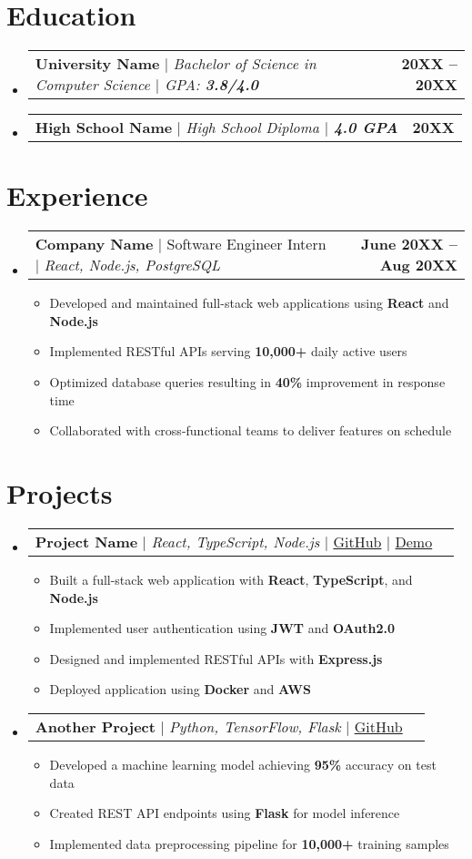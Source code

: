 \documentclass[letterpaper,11pt]{article}
\makeatletter
\newcommand{\resumeItem}[1]{
    \item\small{
        {#1 \vspace{-2pt}}
    }
    }
\newcommand{\resumeProjectHeading}[2]{
        \item
        \begin{tabular*}{1.001\textwidth}{l@{\extracolsep{\fill}}r}
        \small#1 & \textbf{\small #2}\\
        \end{tabular*}\vspace{-7pt}
    }
\newcommand{\resumeSubHeadingListStart}{\begin{itemize}[leftmargin=0.0in, label={}]}
\newcommand{\resumeSubHeadingListEnd}{\end{itemize}}
\newcommand{\resumeItemListStart}{\begin{itemize}}
\newcommand{\resumeItemListEnd}{\end{itemize}\vspace{-5pt}}
\newcommand{\resumeEducationHeading}[2]{
        \item
        \begin{tabular*}{1.001\textwidth}{l@{\extracolsep{\fill}}r}
        \small#1 & \textbf{\small #2}\\
        \end{tabular*}\vspace{-20pt}
    }
\makeatother
\begin{document}
    \section{Education}
        \resumeSubHeadingListStart
            \resumeEducationHeading
                {\textbf{University Name} $|$ \emph{Bachelor of Science in Computer Science  $|$ \textit{GPA: \textbf{3.8/4.0}}}}{20XX -- 20XX}
            \resumeEducationHeading
                {\textbf{High School Name} $|$ \emph{High School Diploma $|$ \textit{\textbf{4.0 GPA}}}}{20XX}
        \resumeSubHeadingListEnd
    \vspace{2pt}

    \section{Experience}
        \resumeSubHeadingListStart
        \resumeProjectHeading
            {\textbf{Company Name} $|$ Software Engineer Intern $|$ \emph{React, Node.js, PostgreSQL}}{June 20XX -- Aug 20XX}
            \resumeItemListStart
                \resumeItem{Developed and maintained full-stack web applications using \textbf{React} and \textbf{Node.js}}
                \resumeItem{Implemented RESTful APIs serving \textbf{10,000+} daily active users}
                \resumeItem{Optimized database queries resulting in \textbf{40\%} improvement in response time}
                \resumeItem{Collaborated with cross-functional teams to deliver features on schedule}
            \resumeItemListEnd 
        \resumeSubHeadingListEnd

    \section{Projects}
        \resumeSubHeadingListStart
        \resumeProjectHeading
            {\textbf{Project Name} $|$ \emph{React, TypeScript, Node.js} $|$ \href{https://github.com/johndoe/project}{GitHub} $|$ \href{https://demo-link.com}{Demo}}{}
            \resumeItemListStart
                \resumeItem{Built a full-stack web application with \textbf{React}, \textbf{TypeScript}, and \textbf{Node.js}}
                \resumeItem{Implemented user authentication using \textbf{JWT} and \textbf{OAuth2.0}}
                \resumeItem{Designed and implemented RESTful APIs with \textbf{Express.js}}
                \resumeItem{Deployed application using \textbf{Docker} and \textbf{AWS}}
            \resumeItemListEnd 

            \vspace{-15pt}
        \resumeProjectHeading
            {\textbf{Another Project} $|$ \emph{Python, TensorFlow, Flask} $|$ \href{https://github.com/johndoe/project2}{GitHub}}{}
            \resumeItemListStart
                \resumeItem{Developed a machine learning model achieving \textbf{95\%} accuracy on test data}
                \resumeItem{Created REST API endpoints using \textbf{Flask} for model inference}
                \resumeItem{Implemented data preprocessing pipeline for \textbf{10,000+} training samples}
            \resumeItemListEnd 
        \resumeSubHeadingListEnd
    \vspace{-10pt}
\end{document}
